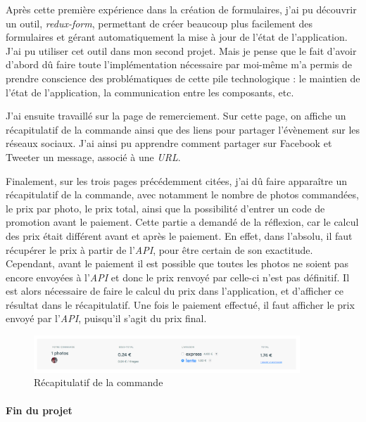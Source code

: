 Après cette première expérience dans la création de formulaires, j'ai pu
découvrir un outil, \emph{redux-form}, permettant de créer beaucoup plus
facilement des formulaires et gérant automatiquement la mise à jour de
l'état de l'application. J'ai pu utiliser cet outil dans mon second
projet. Mais je pense que le fait d'avoir d'abord dû faire toute
l'implémentation nécessaire par moi-même m'a permis de prendre
conscience des problématiques de cette pile technologique : le maintien
de l'état de l'application, la communication entre les composants, etc.

\bigskip

J'ai ensuite travaillé sur la page de remerciement. Sur cette page, on
affiche un récapitulatif de la commande ainsi que des liens pour
partager l'évènement sur les réseaux sociaux. J'ai ainsi pu apprendre
comment partager sur Facebook et Tweeter un message, associé à une
\emph{URL}.

\bigskip

Finalement, sur les trois pages précédemment citées, j'ai dû faire
apparaître un récapitulatif de la commande, avec notamment le nombre de
photos commandées, le prix par photo, le prix total, ainsi que la
possibilité d'entrer un code de promotion avant le paiement. Cette
partie a demandé de la réflexion, car le calcul des prix était différent
avant et après le paiement. En effet, dans l'absolu, il faut récupérer
le prix à partir de l'\emph{API}, pour être certain de son exactitude.
Cependant, avant le paiement il est possible que toutes les photos ne
soient pas encore envoyées à l'\emph{API} et donc le prix renvoyé par
celle-ci n'est pas définitif. Il est alors nécessaire de faire le calcul
du prix dans l'application, et d'afficher ce résultat dans le
récapitulatif. Une fois le paiement effectué, il faut afficher le prix
envoyé par l'\emph{API}, puisqu'il s'agit du prix final.

\begin{figure}[h]
  \centering
  \includegraphics[width=10cm]{figures/photolix-2.png}
  \caption{Récapitulatif de la commande}
\end{figure}

\bigskip

\paragraph{Fin du projet}\label{fin-du-projet}

